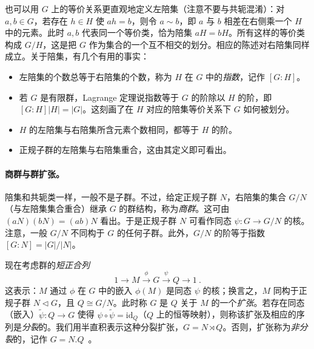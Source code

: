\documentclass[11pt,a4paper,fontset=windows]{ctexart}
\numberwithin{equation}{section}
\newcommand{\Aut}{\operatorname{\text{Aut}}}      %
\newcommand{\myparagraph}[1]{\paragraph{#1}\mbox\\}
\newcommand{\ZZ}{\mathbb{Z}}
\begin{document}
也可以用 $G$ 上的等价关系更直观地定义左陪集（注意不要与共轭混淆）：对 $a,b\in G$，若存在 $h\in H$ 使 $ah=b$，则令 $a\sim b$，即 $a$ 与 $b$ 相差在右侧乘一个 $H$ 中的元素。此时 $a,b$ 代表同一个等价类，恰为陪集 $aH=bH$。所有这样的等价类构成 $G/H$，这是把 $G$ 作为集合的一个互不相交的划分。相应的陈述对右陪集同样成立。关于陪集，有几个有用的事实：
\begin{itemize}
\item 左陪集的个数总等于右陪集的个数，称为 $H$ 在 $G$ 中的\emph{指数}，记作 $[G:H]$。
\item 若 $G$ 是有限群，Lagrange 定理说指数等于 $G$ 的阶除以 $H$ 的阶，即 $[G:H]{|H|}={|G|}$。这刻画了在 $H$ 对应的陪集等价关系下 $G$ 如何被划分。
\item $H$ 的左陪集与右陪集所含元素个数相同，都等于 $H$ 的阶。
\item 正规子群的左陪集与右陪集重合，这由其定义即可看出。
\end{itemize}


\myparagraph{商群与群扩张。}
陪集和共轭类一样，一般不是子群。不过，给定正规子群 $N$，右陪集的集合 $G/N$（与左陪集集合重合）继承 $G$ 的群结构，称为\emph{商群}。这可由 $(aN)(bN) = (ab)N$ 看出。于是正规子群 $N$ 可看作同态 $\psi:G\rightarrow G/N$ 的核。注意，一般 $G/N$ 不同构于 $G$ 的任何子群。此外，$G/N$ 的阶等于指数 $[G:N]=|G|/|N|$。

现在考虑群的\emph{短正合列}
\begin{equation}
1\rightarrow M\xrightarrow{\phi} G\xrightarrow{\psi} Q\rightarrow1~. 
\end{equation}
这表示：$M$ 通过 $\phi$ 在 $G$ 中的嵌入 $\phi(M)$ 是同态 $\psi$ 的核；换言之，$M$ 同构于正规子群 $N\triangleleft G$，且 $Q\cong G/N$。此时称 $G$ 是 $Q$ 关于 $M$ 的一个\emph{扩张}。若存在同态（嵌入）$\widetilde{\psi}:Q\rightarrow G$ 使得 $\psi\circ \widetilde{\psi}=\text{id}_Q$（$Q$ 上的恒等映射），则称该扩张及相应的序列是\emph{分裂}的。我们用半直积表示这种分裂扩张，$G=N\rtimes Q$。否则，扩张称为\emph{非分裂}的，记作 $G=N.Q$~。

\end{document}
